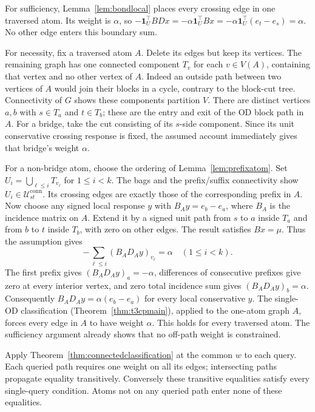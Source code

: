 \begin{pf}
For sufficiency, Lemma~\ref{lem:bondlocal} places every crossing edge
in one traversed atom. Its weight is $\alpha$, so
$-\mathbf1_U^\top BDx=-\alpha\mathbf1_U^\top Bx
=-\alpha\mathbf1_U^\top(e_t-e_s)=\alpha$.
No other edge enters this boundary sum.

For necessity, fix a traversed atom $A$. Delete its edges but keep its
vertices. The remaining graph has one connected component $T_v$ for
each $v\in V(A)$, containing that vertex and no other vertex of $A$.
Indeed an outside path between two vertices of $A$ would join their
blocks in a cycle, contrary to the block-cut tree. Connectivity of $G$
shows these components partition $V$. There are distinct vertices
$a,b$ with $s\in T_a$ and $t\in T_b$; these are the entry and exit of
the OD block path in $A$. For a bridge, take the cut consisting of
its $s$-side component. Since its unit conservative crossing response
is fixed, the assumed account immediately gives that bridge's weight
$\alpha$.

For a non-bridge atom, choose the ordering of
Lemma~\ref{lem:prefixatom}. Set
$U_i=\bigcup_{\ell\le i}T_{v_\ell}$ for $1\le i<k$.
The bags and the prefix/suffix connectivity show
$U_i\in\mathcal U^{\mathrm{conn}}_{st}$. Its crossing edges are exactly
those of the corresponding prefix in $A$.
Now choose any signed local response $y$ with
$B_Ay=e_b-e_a$, where $B_A$ is the incidence matrix on $A$.
Extend it by a signed unit path from $s$ to $a$ inside $T_a$ and from
$b$ to $t$ inside $T_b$, with zero on other edges. The result satisfies
$Bx=\mu$. Thus the assumption gives
\[
-\sum_{\ell\le i}(B_AD_Ay)_{v_\ell}=\alpha
\quad(1\le i<k).
\]
The first prefix gives $(B_AD_Ay)_a=-\alpha$, differences of consecutive
prefixes give zero at every interior vertex, and zero total incidence
sum gives $(B_AD_Ay)_b=\alpha$. Consequently
$B_AD_Ay=\alpha(e_b-e_a)$ for every local conservative $y$.
The single-OD classification (Theorem~\ref{thm:t3cpmain}), applied to the
one-atom graph $A$, forces every edge in $A$ to have weight $\alpha$.
This holds for every traversed atom. The sufficiency argument already
shows that no off-path weight is constrained.
\end{pf}

\begin{pf}
Apply Theorem~\ref{thm:connectedclassification} at the common $w$ to
each query. Each queried path requires one weight on all its edges;
intersecting paths propagate equality transitively. Conversely these
transitive equalities satisfy every single-query condition. Atoms not
on any queried path enter none of these equalities.
\end{pf}

